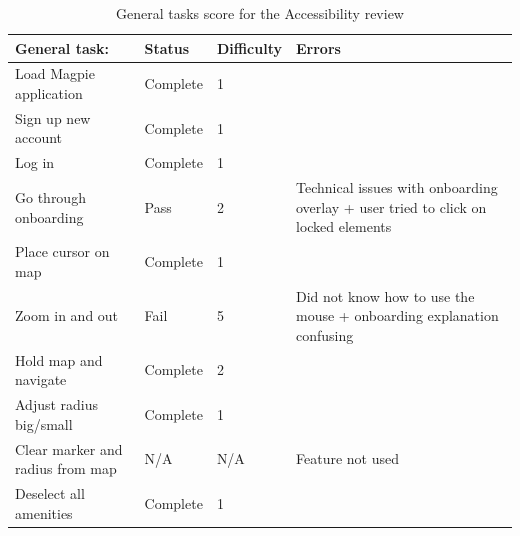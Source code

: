 \begin{table}[h!]
    \centering
    \caption{General tasks score for the Accessibility review}
    \begin{tabular}{|p{}|p{}|p{}|p{}|}
        \hline
        \textbf{General task:}           & \textbf{Status} & \textbf{Difficulty} & \textbf{Errors}                                                                   \\
        \hline
        Load Magpie application          & Complete        & 1                   &                                                                                   \\
        \hline
        Sign up new account              & Complete        & 1                   &                                                                                   \\
        \hline
        Log in                           & Complete        & 1                   &                                                                                   \\
        \hline
        Go through onboarding            & Pass            & 2                   & Technical issues with onboarding overlay + user tried to click on locked elements \\
        \hline
        Place cursor on map              & Complete        & 1                   &                                                                                   \\
        \hline
        Zoom in and out                  & Fail            & 5                   & Did not know how to use the mouse + onboarding explanation confusing              \\
        \hline
        Hold map and navigate            & Complete        & 2                   &                                                                                   \\
        \hline
        Adjust radius big/small          & Complete        & 1                   &                                                                                   \\
        \hline
        Clear marker and radius from map & N/A             & N/A                 & Feature not used                                                                  \\
        \hline
        Deselect all amenities           & Complete        & 1                   &                                                                                   \\

\end{tabular}
\end{table}
